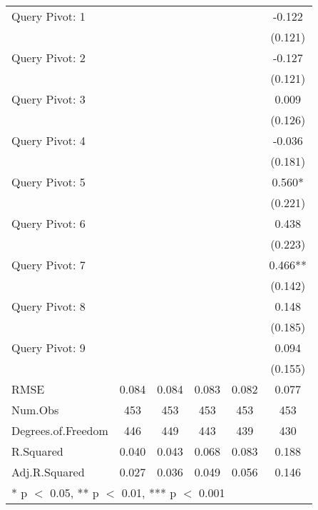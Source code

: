 \begin{table}
\begin{tabular}[t]{lccccc}
Query Pivot: 1 &  &  &  &  & -0.122\\
 &  &  &  &  & \vphantom{1} (0.121)\\
Query Pivot: 2 &  &  &  &  & -0.127\\
 &  &  &  &  & (0.121)\\
Query Pivot: 3 &  &  &  &  & 0.009\\
 &  &  &  &  & (0.126)\\
Query Pivot: 4 &  &  &  &  & -0.036\\
 &  &  &  &  & (0.181)\\
Query Pivot: 5 &  &  &  &  & 0.560*\\
 &  &  &  &  & (0.221)\\
Query Pivot: 6 &  &  &  &  & 0.438\\
 &  &  &  &  & (0.223)\\
Query Pivot: 7 &  &  &  &  & 0.466**\\
 &  &  &  &  & (0.142)\\
Query Pivot: 8 &  &  &  &  & 0.148\\
 &  &  &  &  & (0.185)\\
Query Pivot: 9 &  &  &  &  & 0.094\\
 &  &  &  &  & (0.155)\\
\midrule
RMSE & 0.084 & 0.084 & 0.083 & 0.082 & 0.077\\
Num.Obs & 453 & 453 & 453 & 453 & 453\\
Degrees.of.Freedom & 446 & 449 & 443 & 439 & 430\\
R.Squared & 0.040 & 0.043 & 0.068 & 0.083 & 0.188\\
Adj.R.Squared & 0.027 & 0.036 & 0.049 & 0.056 & 0.146\\
\bottomrule
\multicolumn{6}{l}{\rule{0pt}{1em}* p $<$ 0.05, ** p $<$ 0.01, *** p $<$ 0.001}\\
\end{tabular}
\end{table}
